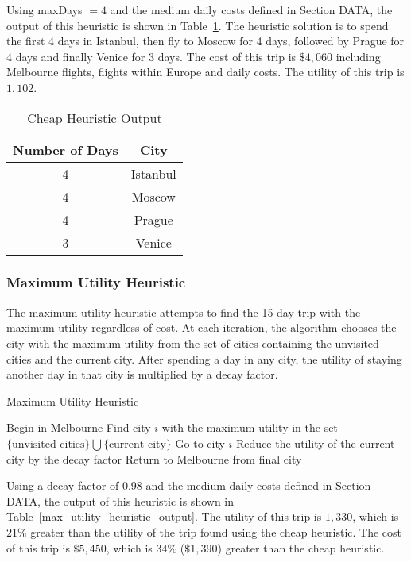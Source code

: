 \documentclass[12pt]{article}
\begin{document}
Using maxDays $= 4$ and the medium daily costs defined in Section DATA, the output of this heuristic is shown in Table~\ref{cheap_heuristic_output}. The heuristic solution is to spend the first 4 days in Istanbul, then fly to Moscow for 4 days, followed by Prague for 4 days and finally Venice for 3 days. The cost of this trip is $\$4,060$ including Melbourne flights, flights within Europe and daily costs. The utility of this trip is $1,102$.

\begin{table}[ht!]
	\centering
	\begin{tabular}{| c || c |}
		\hline
		Number of Days & City \\ \hline \hline
		4 & Istanbul \\ \hline
		4 & Moscow \\ \hline
		4 & Prague \\ \hline
		3 & Venice \\ \hline
	\end{tabular}
	\caption{Cheap Heuristic Output}
	\label{cheap_heuristic_output}
\end{table}

\subsubsection{Maximum Utility Heuristic}

The maximum utility heuristic attempts to find the 15 day trip with the maximum utility regardless of cost. At each iteration, the algorithm chooses the city with the maximum utility from the set of cities containing the unvisited cities and the current city. After spending a day in any city, the utility of staying another day in that city is multiplied by a decay factor.

\begin{algorithm}[ht!]
\caption{Maximum Utility Heuristic}
\begin{algorithmic}
\STATE Begin in Melbourne
\STATE Find city $i$ with the maximum utility in the set $\{ \text{unvisited cities} \} \bigcup \{ \text{current city} \}$
\STATE Go to city $i$
\STATE Reduce the utility of the current city by the decay factor
\ENDFOR
\STATE Return to Melbourne from final city
\end{algorithmic}
\end{algorithm}

Using a decay factor of 0.98 and the medium daily costs defined in Section DATA, the output of this heuristic is shown in Table~\ref{max_utility_heuristic_output}. The utility of this trip is $1,330$, which is $21\%$ greater than the utility of the trip found using the cheap heuristic. The cost of this trip is $\$5,450$, which is $34\%$ ($\$1,390$) greater than the cheap heuristic.
\end{document}
